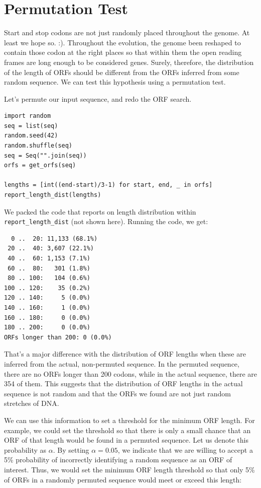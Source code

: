 \section{Permutation Test}

Start and stop codons are not just randomly placed throughout the genome. At least we hope so. :). Throughout the evolution, the genome been reshaped to contain those codon at the right places so that within them the open reading frames are long enough to be considered genes. Surely, therefore, the distribution of the length of ORFs should be different from the ORFs inferred from some random sequence. We can test this hypothesis using a permutation test.

Let's permute our input sequence, and redo the ORF search.

\vspace*{3mm}
\begin{lstlisting}
import random
seq = list(seq)
random.seed(42)
random.shuffle(seq)
seq = Seq("".join(seq))
orfs = get_orfs(seq)

lengths = [int((end-start)/3-1) for start, end, _ in orfs]
report_length_dist(lengths)
\end{lstlisting}

We packed the code that reports on length distribution within \texttt{report\_length\_dist} (not shown here). Running the code, we get:

\vspace*{3mm}
\begin{lstlisting}
  0 ..  20: 11,133 (68.1%)
 20 ..  40: 3,607 (22.1%)
 40 ..  60: 1,153 (7.1%)
 60 ..  80:   301 (1.8%)
 80 .. 100:   104 (0.6%)
100 .. 120:    35 (0.2%)
120 .. 140:     5 (0.0%)
140 .. 160:     1 (0.0%)
160 .. 180:     0 (0.0%)
180 .. 200:     0 (0.0%)
ORFs longer than 200: 0 (0.0%)
\end{lstlisting}

That's a major difference with the distribution of ORF lengths when these are inferred from the actual, non-permuted sequence. In the permuted sequence, there are no ORFs longer than 200 codons, while in the actual sequence, there are 354 of them. This suggests that the distribution of ORF lengths in the actual sequence is not random and that the ORFs we found are not just random stretches of DNA.

We can use this information to set a threshold for the minimum ORF length. For example, we could set the threshold so that there is only a small chance that an ORF of that length would be found in a permuted sequence. Let us denote this probability as $\alpha$. By setting $\alpha = 0.05$, we indicate that we are willing to accept a 5\% probability of incorrectly identifying a random sequence as an ORF of interest. Thus, we would set the minimum ORF length threshold so that only 5\% of ORFs in a randomly permuted sequence would meet or exceed this length:

